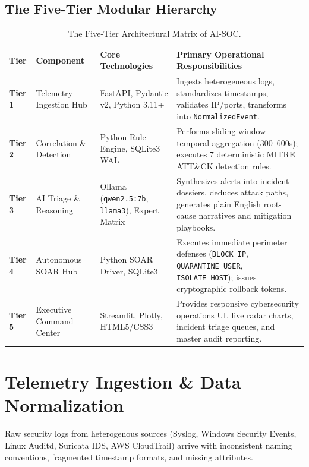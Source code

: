 \documentclass[11pt,a4paper]{article}
\begin{document}
\subsection{The Five-Tier Modular Hierarchy}

\begin{table}[h!]
\centering
\small
\begin{tabularx}{\textwidth}{l p{3.2cm} p{3.5cm} X}
\toprule
\textbf{Tier} & \textbf{Component} & \textbf{Core Technologies} & \textbf{Primary Operational Responsibilities} \\
\midrule
\textbf{Tier 1} & Telemetry Ingestion Hub & FastAPI, Pydantic v2, Python 3.11+ & Ingests heterogeneous logs, standardizes timestamps, validates IP/ports, transforms into \texttt{NormalizedEvent}. \\
\textbf{Tier 2} & Correlation \& Detection & Python Rule Engine, SQLite3 WAL & Performs sliding window temporal aggregation (300--600s); executes 7 deterministic MITRE ATT\&CK detection rules. \\
\textbf{Tier 3} & AI Triage \& Reasoning & Ollama (\texttt{qwen2.5:7b}, \texttt{llama3}), Expert Matrix & Synthesizes alerts into incident dossiers, deduces attack paths, generates plain English root-cause narratives and mitigation playbooks. \\
\textbf{Tier 4} & Autonomous SOAR Hub & Python SOAR Driver, SQLite3 & Executes immediate perimeter defenses (\texttt{BLOCK\_IP}, \texttt{QUARANTINE\_USER}, \texttt{ISOLATE\_HOST}); issues cryptographic rollback tokens. \\
\textbf{Tier 5} & Executive Command Center & Streamlit, Plotly, HTML5/CSS3 & Provides responsive cybersecurity operations UI, live radar charts, incident triage queues, and master audit reporting. \\
\bottomrule
\end{tabularx}
\caption{The Five-Tier Architectural Matrix of AI-SOC.}
\end{table}

\section{Telemetry Ingestion \& Data Normalization}

Raw security logs from heterogenous sources (Syslog, Windows Security Events, Linux Auditd, Suricata IDS, AWS CloudTrail) arrive with inconsistent naming conventions, fragmented timestamp formats, and missing attributes.
\end{document}
